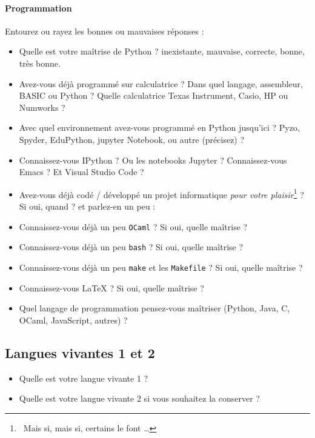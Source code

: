 \paragraph{Programmation}
Entourez ou rayez les bonnes ou mauvaises réponses :
\begin{itemize}
    \item Quelle est votre maîtrise de Python ? inexistante, mauvaise, correcte, bonne, très bonne.
    \item Avez-vous déjà programmé sur calculatrice ? Dans quel langage, assembleur, BASIC ou Python ? Quelle calculatrice Texas Instrument, Casio, HP ou Numworks ?
    \item Avec quel environnement avez-vous programmé en Python jusqu'ici ? Pyzo, Spyder, EduPython, jupyter Notebook, ou autre (précisez) ?
    \item Connaissez-vous IPython ? Ou les notebooks Jupyter ? Connaissez-vous Emacs ? Et Visual Studio Code ?
    \item Avez-vous déjà codé / développé un projet informatique \emph{pour votre plaisir}\footnote{~Mais si, mais si, certains le font \dots} ? Si oui, quand ? et parlez-en un peu :
        \vspace*{20pt}

    \item Connaissez-vous déjà un peu \verb|OCaml| ? Si oui, quelle maîtrise ?
    \item Connaissez-vous déjà un peu \verb|bash| ? Si oui, quelle maîtrise ?
    \item Connaissez-vous déjà un peu \verb|make| et les \verb|Makefile| ? Si oui, quelle maîtrise ?
    \item Connaissez-vous \LaTeX{} ? Si oui, quelle maîtrise ?
    \item Quel langage de programmation pensez-vous maîtriser (Python, Java, C, OCaml, JavaScript, autres) ?
        \vspace*{20pt}
\end{itemize}


\subsection*{Langues vivantes 1 et 2}
\begin{itemize}
    \item Quelle est votre langue vivante 1 ?
    \item Quelle est votre langue vivante 2 si vous souhaitez la conserver ?
\end{itemize}

